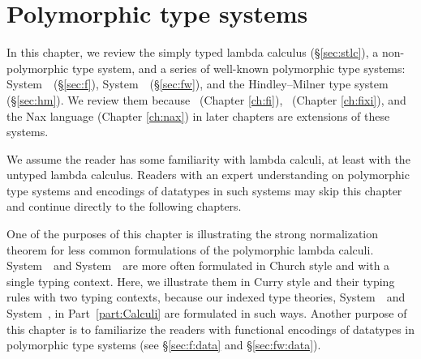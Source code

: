 \chapter{Polymorphic type systems}\label{ch:poly}
In this chapter, we review the simply typed lambda calculus (\S\ref{sec:stlc}),
a non-polymorphic type system, and
a series of well-known polymorphic type systems:
System~\F\ (\S\ref{sec:f}), System~\Fw\ (\S\ref{sec:fw}),
and the Hindley--Milner type system (\S\ref{sec:hm}).
We review them because \Fi\ (Chapter \ref{ch:fi}),
\Fixi\ (Chapter \ref{ch:fixi}), and the Nax language (Chapter \ref{ch:nax})
in later chapters are extensions of these systems.

We assume the reader has some familiarity with lambda calculi, at least
with the untyped lambda calculus. Readers with an expert understanding on
polymorphic type systems and encodings of datatypes in such systems
may skip this chapter and continue directly to the following chapters.

One of the purposes of this chapter is illustrating
the strong normalization theorem for less common formulations of
the polymorphic lambda calculi. System~\F\ and System~\Fw\ are more often
formulated in Church style and with a single typing context. Here,
we illustrate them in Curry style and their typing rules with two
typing contexts, because our indexed type theories, System~\Fi\ and
System~\Fixi, in Part~\ref{part:Calculi} are formulated in such ways.
Another purpose of this chapter is to familiarize the readers with
functional encodings of datatypes in polymorphic type systems
(see \S\ref{sec:f:data} and \S\ref{sec:fw:data}).


